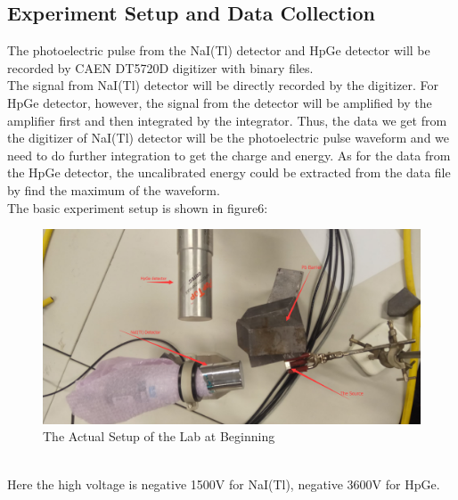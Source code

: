 \documentclass[12pt]{article}
\begin{document}
	\subsection{Experiment Setup and Data Collection}
	The photoelectric pulse from the NaI(Tl) detector and HpGe detector will be recorded by CAEN DT5720D digitizer with binary files. \\
	The signal from NaI(Tl) detector will be directly recorded by the digitizer. For HpGe detector, however, the signal from the detector will be amplified by the amplifier first and then integrated by the  integrator. Thus, the data we get from the digitizer of NaI(Tl) detector will be the photoelectric pulse waveform and we need to do further integration to get the charge and energy. As for the data from the HpGe detector, the uncalibrated energy could be extracted from the data file by find the maximum of the waveform.\\
	The basic experiment setup is shown in figure6:
	\begin{figure}[h]
		\centering
		\includegraphics[width=0.7\linewidth, height=0.2\textheight]{pic/experiment_lab_set}
		\caption{The Actual Setup of the Lab at Beginning}
		\label{fig:experimentlabset}
	\end{figure}\\
	Here the high voltage is negative 1500V for NaI(Tl), negative 3600V for HpGe. 
\end{document}
